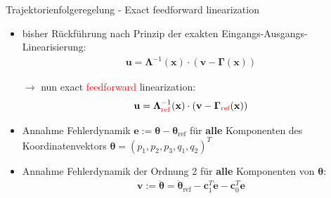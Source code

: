 \documentclass[
	ngerman,
	10pt,				%
	aspectratio=169 	%
]{beamer}
\begin{document}
\begin{frame}[t,fragile,label=trajektorienregelung_9]{\large Trajektorienfolgeregelung - Exact feedforward linearization}
	
	\begin{itemize}
		\item bisher Rückführung nach Prinzip der exakten Eingangs-Ausgangs-Linearisierung:
		\begin{align*}
			\mathbf{u} = \boldsymbol{\Lambda }^{-1}(\mathbf{x}) \cdot (\mathbf{v} - \boldsymbol{\Gamma}(\mathbf{x}))
		\end{align*}
		\item[$\rightarrow$] nun exact \textcolor{red}{feedforward} linearization:
		\begin{align*}
			\mathbf{u} = \boldsymbol{\Lambda}_{\textcolor{red}{\text{ref}}}^{-1}(\mathbf{x}) \cdot (\mathbf{v} - \boldsymbol{\Gamma}_{\textcolor{red}{\text{ref}}}(\mathbf{x}))
		\end{align*}
		\bigskip
		\pause
		\item Annahme Fehlerdynamik $\mathbf{e} := \boldsymbol{\theta} - \boldsymbol{\theta}_{\text{ref}}$ für \textbf{alle} Komponenten des Koordinatenvektors $\boldsymbol{\theta} = (p_1, p_2, p_3, q_1, q_2)^T$
		\bigskip
		\pause
		\item Annahme Fehlerdynamik der Ordnung 2 für \textbf{alle} Komponenten von $\boldsymbol{\theta}$:
		\begin{align*}
			\mathbf{v} := \ddot{\boldsymbol{\theta}} = \ddot{\boldsymbol{\theta}}_{\text{ref}} - \mathbf{c}_1^T \dot{\mathbf{e}} - \mathbf{c}_0^T \mathbf{e}
		\end{align*}
	\end{itemize}
	
\end{frame}

  
\end{document}
